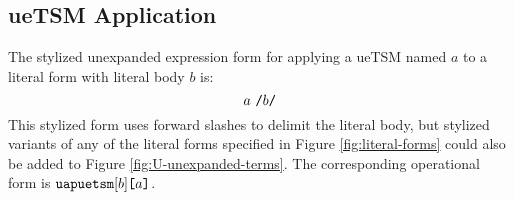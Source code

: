 \subsection{ueTSM Application}\label{sec:U-uetsm-application}
The stylized unexpanded expression form for applying a ueTSM named $a$ to a literal form with literal body $b$ is:
\[
a~\texttt{/}b\texttt{/}
\] 
This stylized form uses forward slashes to delimit the literal body, but stylized variants of any of the literal forms specified in Figure \ref{fig:literal-forms} could also be added to Figure \ref{fig:U-unexpanded-terms}. %
The corresponding operational form is $\texttt{uapuetsm}[b]\texttt{[}a\texttt{]}$. %

